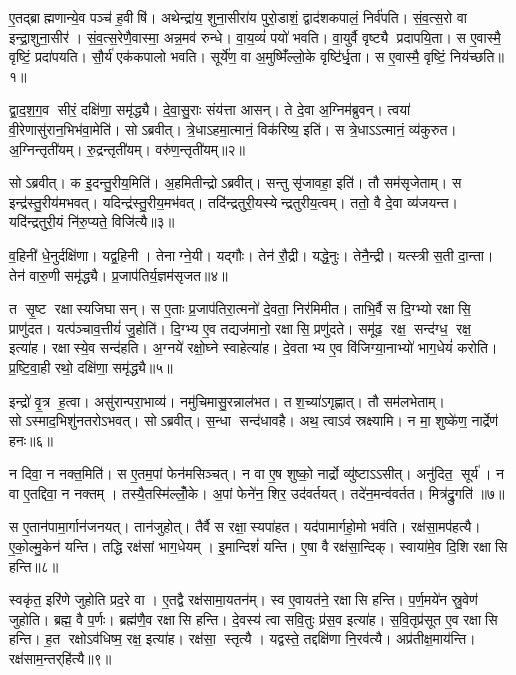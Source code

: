 ए॒तद्ब्राह्मणान्ये॒व पञ्च॑ ह॒वीषि॑।
अथेन्द्रा॑य॒ शुना॒सीरा॑य पुरो॒डाशं॒ द्वाद॑शकपालं॒ निर्व॑पति।
सं॒व॒त्स॒रो वा इन्द्रा॒शुना॒सीर॑।
सं॒व॒त्स॒रेणै॒वास्मा॒ अन्न॒मव॑ रुन्धे।
वा॒य॒व्यं॑ पयो॑ भवति।
वा॒युर्वै वृष्ट्यै प्रदापयि॒ता।
स ए॒वास्मै॒ वृष्टिं॒ प्रदा॑पयति।
सौ॒र्य॑ एक॑कपालो भवति।
सूर्ये॑ण॒ वा अ॒मुष्मिँ॑ल्लो॒के वृष्टि॑र्धृ॒ता।
स ए॒वास्मै॒ वृष्टिं॒ निय॑च्छति॥१॥

द्वा॒द॒श॒ग॒व सीरं॒ दक्षि॑णा॒ समृ॑द्ध्यै।
दे॒वा॒सु॒राः संय॑त्ता आसन्।
ते दे॒वा अ॒ग्निम॑ब्रुवन्।
त्वया॑ वी॒रेणासु॑रान॒भिभ॑वा॒मेति॑।
सोऽब्रवीत्।
त्रे॒धाऽहमा॒त्मानं॒ विक॑रिष्य॒ इति॑।
स त्रे॒धाऽऽत्मानं॒ व्य॑कुरुत।
अ॒ग्निन्तृती॑यम्।
रु॒द्रन्तृती॑यम्।
वरु॑ण॒न्तृती॑यम्॥२॥

सोऽब्रवीत्।
क इ॒दन्तु॒रीय॒मिति॑।
अ॒हमितीन्द्रोऽब्रवीत्।
सन्तु सृ॑जावहा॒ इति॑।
तौ सम॑सृजेताम्।
स इन्द्र॑स्तु॒रीय॑मभवत्।
यदिन्द्र॑स्तु॒रीय॒मभ॑वत्।
तदि॑न्द्रतुरी॒यस्येन्द्रतुरीय॒त्वम्।
ततो॒ वै दे॒वा व्य॑जयन्त।
यदि॑न्द्रतुरी॒यं नि॑रु॒प्यते॒ विजि॑त्यै॥३॥

व॒हिनी॑ धे॒नुर्दक्षि॑णा।
यद्व॒हिनी।
तेनाग्ने॒यी।
यद्गौः।
तेन॑ रौ॒द्री।
यद्धे॒नुः।
तेनै॒न्द्री।
यत्स्त्री स॒ती दा॒न्ता।
तेन॑ वारु॒णी समृ॑द्ध्यै।
प्र॒जाप॑तिर्य॒ज्ञम॑सृजत॥४॥

त सृ॒ष्ट रक्षास्यजिघासन्।
स ए॒ताः प्र॒जाप॑तिरा॒त्मनो॑ दे॒वता॒ निर॑मिमीत।
ताभि॒र्वै स दि॒ग्भ्यो रक्षासि॒ प्राणु॑दत।
यत्प॑ञ्चाव॒त्तीयं॑ जु॒होति॑।
दि॒ग्भ्य ए॒व तद्यज॑मानो॒ रक्षासि॒ प्रणु॑दते।
समू॑ढ॒ रक्ष॒ सन्द॑ग्ध॒ रक्ष॒ इत्या॑ह।
रक्षास्ये॒व सन्द॑हति।
अ॒ग्नये॑ रक्षो॒घ्ने स्वाहेत्या॑ह।
दे॒वताभ्य ए॒व वि॑जिग्या॒नाभ्यो॑ भाग॒धेयं॑ करोति।
प्र॒ष्टि॒वा॒ही रथो॒ दक्षि॑णा॒ समृ॑द्ध्यै॥५॥

इन्द्रो॑ वृ॒त्र ह॒त्वा।
असु॑रान्परा॒भाव्य॑।
नमु॑चिमासु॒रन्नाल॑भत।
तश॒च्या॑ऽगृह्णात्।
तौ सम॑लभेताम्।
सोऽस्माद॒भिशु॑नतरोऽभवत्।
सोऽब्रवीत्।
स॒न्धा सन्द॑धावहै।
अथ॒ त्वाऽव॑ स्रक्ष्यामि।
न मा॒ शुष्के॑ण॒ नार्द्रेण॑ हनः॥६॥

न दिवा॒ न नक्त॒मिति॑।
स ए॒तम॒पां फेन॑मसिञ्चत्।
न वा ए॒ष शुष्को॒ नार्द्रो व्यु॑ष्टाऽऽसीत्।
अनु॑दित॒ सूर्य॑।
न वा ए॒तद्दिवा॒ न नक्तम्।
तस्यै॒तस्मि॑ल्लोँ॒के।
अ॒पां फेने॑न॒ शिर॒ उद॑वर्तयत्।
तदे॑न॒मन्व॑वर्तत।
मित्र॑द्रु॒गति॑ ॥७॥

स ए॒तान॑पामा॒र्गान॑जनयत्।
तान॑जुहोत्।
तैर्वै स रक्षा॒स्यपा॑हत।
यद॑पामार्गहो॒मो भव॑ति।
रक्ष॑सा॒मप॑हत्यै।
ए॒को॒ल्मु॒केन॑ यन्ति।
तद्धि रक्ष॑सां भाग॒धेयम्।
इ॒मान्दिशं॑ यन्ति।
ए॒षा वै रक्ष॑सा॒न्दिक्।
स्वाया॑मे॒व दि॒शि रक्षासि हन्ति॥८॥

स्वकृ॑त॒ इरि॑णे जुहोति प्रद॒रे वा।
ए॒तद्वै रक्ष॑सामा॒यतन॑म्।
स्व ए॒वायत॑ने॒ रक्षासि हन्ति।
प॒र्ण॒मये॑न स्रु॒वेण॑ जुहोति।
ब्रह्म॒ वै प॒र्णः।
ब्रह्म॑णै॒व रक्षासि हन्ति।
दे॒वस्य॑ त्वा सवि॒तुः प्र॑स॒व इत्या॑ह।
स॒वि॒तृप्र॑सूत ए॒व रक्षासि हन्ति।
ह॒त रक्षोऽव॑धिष्म॒ रक्ष॒ इत्या॑ह।
रक्ष॑सा॒ स्तृत्यै।
यद्वस्ते॒ तद्दक्षि॑णा नि॒रव॑त्यै।
अप्र॑तीक्ष॒माय॑न्ति।
रक्ष॑साम॒न्तर्‌हि॑त्यै॥९॥\anuvakamend[य॒च्छ॒ति॒ वरु॑ण॒न्तृती॑यं॒ विजि॑त्या असृजत॒ समृ॑द्ध्यै हनो॒ मित्र॑द्रु॒गिति॑ हन्ति॒ स्तृत्यै॒ त्रीणि॑ च]

